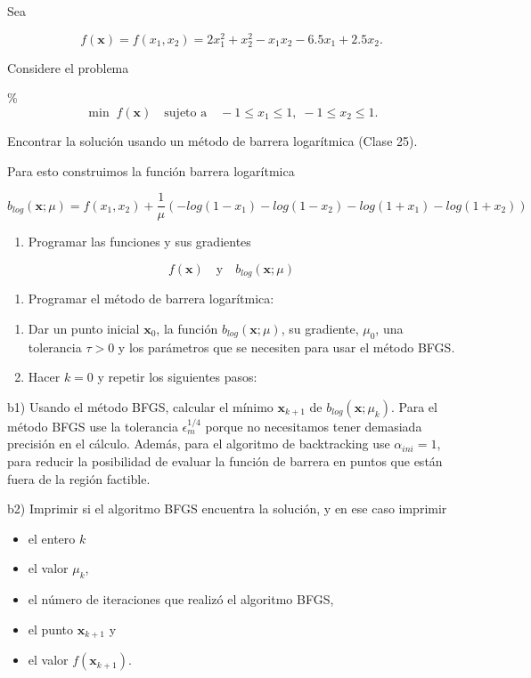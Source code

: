 \documentclass[11pt]{article}
\providecommand{\tightlist}{%
      \setlength{\itemsep}{0pt}\setlength{\parskip}{0pt}}
\begin{document}
Sea

\[ f(\mathbf{x}) = f(x_1, x_2) = 2x_1^{2} + x_2^{2} - x_1 x_2 - 6.5x_1  + 2.5x_2. \]

Considere el problema

\%
\[ \min\; f(\mathbf{x}) \quad \text{sujeto a} \quad -1\leq x_1 \leq 1, \; -1\leq x_2 \leq 1.\]

Encontrar la solución usando un método de barrera logarítmica (Clase
25).

Para esto construimos la función barrera logarítmica

\[
b_{log}(\mathbf{x}; \mu) = f(x_1,x_2) + \frac{1}{\mu}(-log(1-x_1)-log(1-x_2)-log(1+x_1)-log(1+x_2) )
\]

\begin{enumerate}
\def\labelenumi{\arabic{enumi}.}
\tightlist
\item
  Programar las funciones y sus gradientes
\end{enumerate}

\[f(\mathbf{x}) \quad \text{y} \quad b_{log}(\mathbf{x}; \mu) \]

\begin{enumerate}
\def\labelenumi{\arabic{enumi}.}
\setcounter{enumi}{1}
\tightlist
\item
  Programar el método de barrera logarítmica:
\end{enumerate}

\begin{enumerate}
\def\labelenumi{\alph{enumi})}
\item
  Dar un punto inicial \(\mathbf{x}_0\), la función
  \(b_{log}(\mathbf{x}; \mu)\), su gradiente, \(\mu_0\), una tolerancia
  \(\tau>0\) y los parámetros que se necesiten para usar el método BFGS.
\item
  Hacer \(k=0\) y repetir los siguientes pasos:
\end{enumerate}

b1) Usando el método BFGS, calcular el mínimo \(\mathbf{x}_{k+1}\) de
\(b_{log}(\mathbf{x}; \mu_k)\). Para el método BFGS use la tolerancia
\(\epsilon_m^{1/4}\) porque no necesitamos tener demasiada precisión en
el cálculo. Además, para el algoritmo de backtracking use
\(\alpha_{ini}=1\), para reducir la posibilidad de evaluar la función de
barrera en puntos que están fuera de la región factible.

b2) Imprimir si el algoritmo BFGS encuentra la solución, y en ese caso
imprimir

\begin{itemize}
\tightlist
\item
  el entero \(k\)
\item
  el valor \(\mu_k\),
\item
  el número de iteraciones que realizó el algoritmo BFGS,
\item
  el punto \(\mathbf{x}_{k+1}\) y
\item
  el valor \(f(\mathbf{x}_{k+1})\).
\end{itemize}
\end{document}
